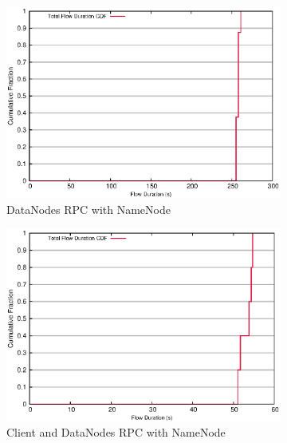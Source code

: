 \begin{figure}[!htbp]
\centering
  \begin{subfigure}[b]{.45\linewidth}
   \centering
	\includegraphics[width=.99\textwidth]{figures/6writes/24_28_type_flow_duration.eps} 
	\caption{DataNodes RPC with NameNode}\label{fig:write_duration:dn_rpc}
   \end{subfigure}%
  \begin{subfigure}[b]{.45\linewidth}
   \centering
	\includegraphics[width=.99\textwidth]{figures/6writes/24_28_20_16_type_flow_duration.eps} 
	\caption{Client and DataNodes RPC with NameNode}\label{fig:write_duration:dc_rpc}
   \end{subfigure} \\%
  \begin{subfigure}[b]{.45\linewidth}
   \centering

\end{subfigure}
\end{figure}
